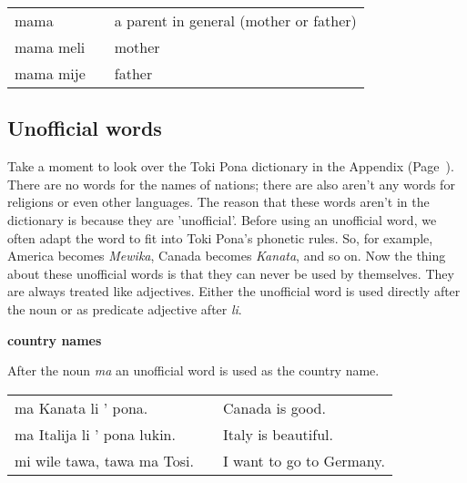 \begin{supertabular}{p{5,5cm}|ll}
mama && a parent in general (mother or father) \\
mama meli && mother \\
mama mije && father \\
\end{supertabular} 

%
\subsection*{Unofficial words}
%
Take a moment to look over the Toki Pona dictionary in the Appendix (Page~\pageref{'unofficial_words'}). 
There are no words for the names of nations; there are also aren't any words for religions or even other languages. 
The reason that these words aren't in the dictionary is because they are 'unofficial'. 
Before using an unofficial word, we often adapt the word to fit into Toki Pona's phonetic rules. 
So, for example, America becomes \textit{Mewika}, Canada becomes \textit{Kanata}, and so on. 
Now the thing about these unofficial words is that they can never be used by themselves. 
They are always treated like adjectives. 
Either the unofficial word is used directly after the noun or as predicate adjective after \textit{li}. 

\textbf{country names}

After the noun \textit{ma} an unofficial word is used as the country name. 

\begin{supertabular}{p{5,5cm}|ll}
ma Kanata li ' pona. && Canada is good. \\
ma Italija li ' pona lukin. && Italy is beautiful. \\
mi wile tawa, tawa ma Tosi. && I want to go to Germany. \\
\end{supertabular} 

